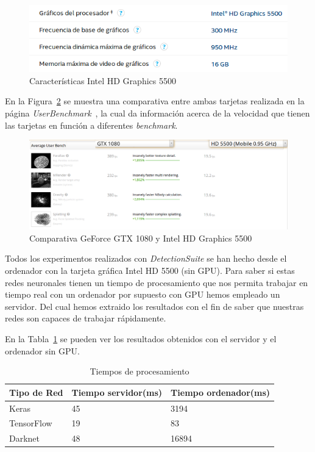 \begin{figure}[H] 
\begin{center}
	\includegraphics[scale=0.7]{figures/Experimentos/intel.png}
   \caption{Características Intel HD Graphics 5500}
	\label{fig.intel}
\end{center}
\end{figure}

En la Figura~\ref{fig.comparativa} se muestra una comparativa entre ambas tarjetas realizada en la página \textit{UserBenchmark}~\cite{benchmark}, la cual da información acerca de la velocidad que tienen las tarjetas en función a diferentes \textit{benchmark}.

\begin{figure}[H] 
\begin{center}
	\includegraphics[scale=0.4]{figures/Experimentos/comparativa.png}
   \caption{Comparativa GeForce GTX 1080 y Intel HD Graphics 5500}
	\label{fig.comparativa}
\end{center}
\end{figure}

Todos los experimentos realizados con \textit{DetectionSuite} se han hecho desde el ordenador con la tarjeta gráfica Intel HD 5500 (sin GPU). Para saber si estas redes neuronales tienen un tiempo de procesamiento que nos permita trabajar en tiempo real con un ordenador por supuesto con GPU hemos empleado un servidor. Del cual hemos extraido los resultados con el fin de saber que nuestras redes son capaces de trabajar rápidamente.


En la Tabla~\ref{tiempos} se pueden ver los resultados obtenidos con el servidor y el ordenador sin GPU.

\begin{table}[H]
\begin{center}
\begin{tabular}{|l|l|l|}
\hline
Tipo de Red & Tiempo servidor(ms) & Tiempo ordenador(ms)  \\ 
\hline \hline
Keras & 45 & 3194 \\ \hline
TensorFlow & 19 & 83 \\ \hline
Darknet & 48 & 16894 \\ \hline
\end{tabular}
\caption{Tiempos de procesamiento}
\label{tiempos}
\end{center}
\end{table}

